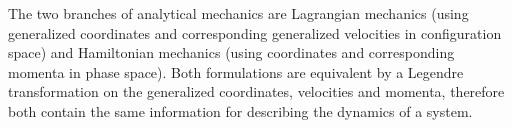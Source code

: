 

{\small
\setlength{\abovedisplayskip}{2pt}\setlength{\belowdisplayskip}{2pt}
The two branches of analytical mechanics are
Lagrangian mechanics
(using generalized coordinates and corresponding generalized velocities in configuration space)
and Hamiltonian mechanics
(using coordinates and corresponding momenta in phase space).
Both formulations are equivalent
by a Legendre transformation
on the generalized coordinates,
velocities and momenta,
therefore both contain the same information
for describing the dynamics
of a system.

\par}

